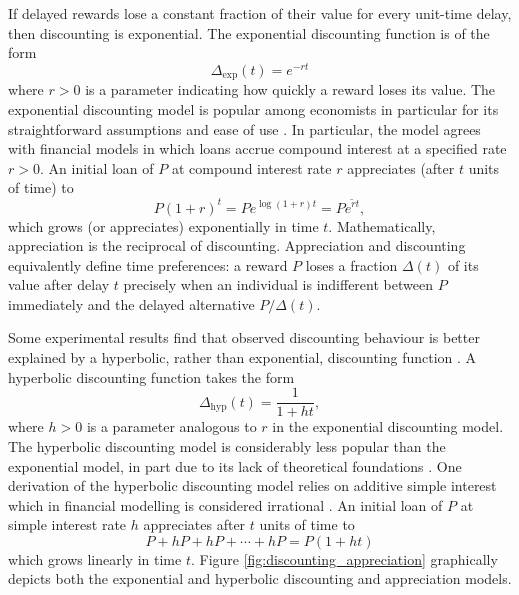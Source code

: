 \documentclass[titlepage, hidelinks, 12pt]{article}
\theoremstyle{plain}
\theoremstyle{remark}
\theoremstyle{definition}
\DeclareMathOperator{\hyp}{hyp}
\begin{document}
If delayed rewards lose a constant fraction of their value for every unit-time delay, then discounting is exponential. The exponential
discounting function is of the form
\begin{equation}
    \Delta_{\exp}(t) = e^{-r t}
\end{equation}
where $r>0$ is a parameter indicating how quickly a reward loses its value. 
The exponential discounting model is popular among economists in particular
for its straightforward assumptions and ease of use \cite{sozou98}. 
In particular, the model 
agrees with financial models in which loans accrue compound interest at a specified rate $r>0$. An initial loan of $P$ at compound interest
rate $r$ appreciates (after $t$ units of time) to 
\begin{equation}
    P(1 + r)^{t} = Pe^{\log(1+r) t} = Pe^{\tilde{r}t},
    \label{eqn:compound_interest}
\end{equation}
which grows (or appreciates) exponentially in time $t$. 
Mathematically, appreciation is the reciprocal of discounting. Appreciation and discounting equivalently define time preferences: a reward $P$ loses 
a fraction $\Delta(t)$ of its value after delay $t$ precisely when an individual is indifferent between $P$ immediately and the delayed alternative
$P/\Delta(t)$.



Some experimental results find that observed discounting behaviour is better explained
by a hyperbolic, rather than exponential, discounting function \cite{maia09, green04, doyle12}. A hyperbolic discounting function takes
the form
\begin{equation}
    \Delta_{\hyp}(t) = \frac{1}{1+ht},
\end{equation}
where $h>0$ is a parameter analogous to $r$ in the exponential discounting model. The hyperbolic discounting model is considerably less
popular than the exponential model, in part due to its lack of theoretical foundations \cite{sozou98}. 
One derivation of the hyperbolic discounting model relies
on additive simple interest which in financial modelling is considered irrational \cite{rachlin06}. An initial loan
of $P$ at simple interest rate $h$ appreciates after $t$ units of time to
\begin{equation}
    P + hP + hP + \cdots + hP = P(1 + ht)
    \label{eqn:simple_interest}
\end{equation}
which grows linearly in time $t$. Figure \ref{fig:discounting_appreciation} graphically depicts both the exponential and hyperbolic discounting
and appreciation models. 
\end{document}
